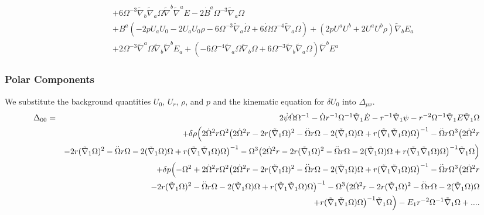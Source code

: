 \documentclass[10pt,letterpaper]{article}
\numberwithin{equation}{section}
\begin{document}
\begin{eqnarray}
&& + 6 \Omega^{-3} \tilde{\nabla}_{b}\tilde{\nabla}_{a}\Omega \tilde{\nabla}^{b}\tilde{\nabla}^{a}E-2 \dot{B}^{a} \Omega^{-3} \tilde{\nabla}_{a}\Omega \nonumber \\ 
&& + B^{a} (-2 p U_{a} U_{0}{} - 2 U_{a} U_{0}{} \rho - 6 \Omega^{-3} \tilde{\nabla}_{a}\dot{\Omega} + 6 \dot{\Omega} \Omega^{-4} \tilde{\nabla}_{a}\Omega) + (2 p U^{a} U^{b} + 2 U^{a} U^{b} \rho) \tilde{\nabla}_{b}E_{a} \nonumber \\ 
&& + 2 \Omega^{-3} \tilde{\nabla}^{a}\Omega \tilde{\nabla}_{b}\tilde{\nabla}^{b}E_{a} + (-6 \Omega^{-4} \tilde{\nabla}_{a}\Omega \tilde{\nabla}_{b}\Omega + 6 \Omega^{-3} \tilde{\nabla}_{b}\tilde{\nabla}_{a}\Omega) \tilde{\nabla}^{b}E^{a}
\end{eqnarray}
%
\subsubsection{Polar Components}
We substitute the background quantities $U_0$, $U_r$, $\rho$, and $p$ and the kinematic equation for $\delta U_0$ into $\Delta_{\mu\nu}$. 
\begin{eqnarray}
\Delta_{00}&=& 2 \dot{\psi} \dot{\Omega} \Omega^{-1} -  \dot{\Omega} r^{-1} \Omega^{-1} \tilde{\nabla}_{1}\dot{E} -  r^{-1} \tilde{\nabla}_{1}\psi -  r^{-2} \Omega^{-1} \tilde{\nabla}_{1}E \tilde{\nabla}_{1}\Omega \nonumber \\ 
&& + \delta \rho \Bigl(2 \dot{\Omega}^2 r \Omega^2 \bigl(2 \dot{\Omega}^2 r - 2 r (\tilde{\nabla}_{1}\Omega)^2 -  \overset{..}{\Omega} r \Omega - 2 (\tilde{\nabla}_{1}\Omega) \Omega + r (\tilde{\nabla}_{1}\tilde{\nabla}_{1}\Omega) \Omega \bigr)^{-1} -  \overset{..}{\Omega} r \Omega^3 \bigl(2 \dot{\Omega}^2 r
\nonumber\\
&& -2r(\tilde{\nabla}_{1}\Omega)^2 -  \overset{..}{\Omega} r \Omega - 2 (\tilde{\nabla}_{1}\Omega) \Omega + r (\tilde{\nabla}_{1}\tilde{\nabla}_{1}\Omega) \Omega \bigr)^{-1} -  \Omega^3 \bigl(2 \dot{\Omega}^2 r - 2 r (\tilde{\nabla}_{1}\Omega)^2 -  \overset{..}{\Omega} r \Omega - 2 (\tilde{\nabla}_{1}\Omega) \Omega + r (\tilde{\nabla}_{1}\tilde{\nabla}_{1}\Omega) \Omega \bigr)^{-1} \tilde{\nabla}_{1}\Omega \Bigr) \nonumber \\ 
&& + \delta p \Bigl(- \Omega^2 + 2 \dot{\Omega}^2 r \Omega^2 \bigl(2 \dot{\Omega}^2 r - 2 r (\tilde{\nabla}_{1}\Omega)^2 -  \overset{..}{\Omega} r \Omega - 2 (\tilde{\nabla}_{1}\Omega) \Omega + r (\tilde{\nabla}_{1}\tilde{\nabla}_{1}\Omega) \Omega \bigr)^{-1} -  \overset{..}{\Omega} r \Omega^3 \bigl(2 \dot{\Omega}^2 r
\nonumber\\
&& - 2 r (\tilde{\nabla}_{1}\Omega)^2 -  \overset{..}{\Omega} r \Omega - 2 (\tilde{\nabla}_{1}\Omega) \Omega + r (\tilde{\nabla}_{1}\tilde{\nabla}_{1}\Omega) \Omega \bigr)^{-1} -  \Omega^3 \bigl(2 \dot{\Omega}^2 r - 2 r (\tilde{\nabla}_{1}\Omega)^2 -  \overset{..}{\Omega} r \Omega - 2 (\tilde{\nabla}_{1}\Omega) \Omega 
\nonumber\\
&&+ r (\tilde{\nabla}_{1}\tilde{\nabla}_{1}\Omega) \Omega \bigr)^{-1} \tilde{\nabla}_{1}\Omega \Bigr)- E_{1} r^{-2} \Omega^{-1} \tilde{\nabla}_{1}\Omega + .... 
\end{eqnarray}
%
%
\newpage
\end{document}
